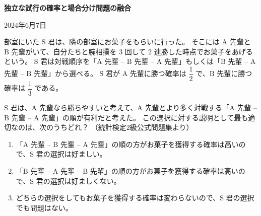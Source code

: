 \documentclass[12pt]{ltjsarticle}
\begin{document}
\pagestyle{empty}

{\Large%
\noindent
\textbf{%
独立な試行の確率と場合分け問題の融合
}}

\begin{flushleft}
$2024$年$6$月$7$日 \\
\end{flushleft}

部室にいた $\mathrm{S}$ 君は、隣の部室にお菓子をもらいに行った。
そこには $\mathrm{A}$ 先輩と $\mathrm{B}$ 先輩がいて、自分たちと腕相撲を $3$ 回して $2$ 連勝した時点でお菓子をあげるという。
$\mathrm{S}$ 君は対戦順序を「$\mathrm{A}$ 先輩 -- $\mathrm{B}$ 先輩 -- $\mathrm{A}$ 先輩」もしくは「$\mathrm{B}$ 先輩 -- $\mathrm{A}$ 先輩 -- $\mathrm{B}$ 先輩」から選べる。
$\mathrm{S}$ 君が $\mathrm{A}$ 先輩に勝つ確率は $\dfrac{1}{2}$ で、$\mathrm{B}$ 先輩に勝つ確率は $\dfrac{1}{3}$ である。

$\mathrm{S}$ 君は、$\mathrm{A}$ 先輩なら勝ちやすいと考えて、$\mathrm{A}$ 先輩とより多く対戦する「$\mathrm{A}$ 先輩 -- $\mathrm{B}$ 先輩 -- $\mathrm{A}$ 先輩」の順が有利だと考えた。
この選択に対する説明として最も適切なのは、次のうちどれ？
（統計検定$2$級公式問題集より）

\begin{enumerate}
\item 「$\mathrm{A}$ 先輩 -- $\mathrm{B}$ 先輩 -- $\mathrm{A}$ 先輩」の順の方がお菓子を獲得する確率は高いので、$\mathrm{S}$ 君の選択は好ましい。
\item 「$\mathrm{B}$ 先輩 -- $\mathrm{A}$ 先輩 -- $\mathrm{B}$ 先輩」の順の方がお菓子を獲得する確率は高いので、$\mathrm{S}$ 君の選択は好ましくない。
\item どちらの選択をしてもお菓子を獲得する確率は変わらないので、$\mathrm{S}$ 君の選択でも問題はない。
\end{enumerate}
\end{document}
